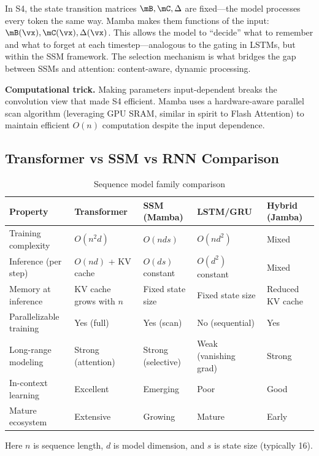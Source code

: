 \begin{keyinsight}
In S4, the state transition matrices $\mB, \mC, \Delta$ are fixed---the model processes every token the same way. Mamba makes them functions of the input: $\mB(\vx), \mC(\vx), \Delta(\vx)$. This allows the model to ``decide'' what to remember and what to forget at each timestep---analogous to the gating in LSTMs, but within the SSM framework. The selection mechanism is what bridges the gap between SSMs and attention: content-aware, dynamic processing.
\end{keyinsight}

\textbf{Computational trick.} Making parameters input-dependent breaks the convolution view that made S4 efficient. Mamba uses a hardware-aware parallel scan algorithm (leveraging GPU SRAM, similar in spirit to Flash Attention) to maintain efficient $O(n)$ computation despite the input dependence.

\subsection{Transformer vs SSM vs RNN Comparison}

\begin{table}[H]
\centering
\caption{Sequence model family comparison}
\begin{tabularx}{\textwidth}{lXXXX}
\toprule
\textbf{Property} & \textbf{Transformer} & \textbf{SSM (Mamba)} & \textbf{LSTM/GRU} & \textbf{Hybrid (Jamba)} \\
\midrule
Training complexity & $O(n^2 d)$ & $O(n d s)$ & $O(n d^2)$ & Mixed \\
Inference (per step) & $O(nd)$ + KV cache & $O(d s)$ constant & $O(d^2)$ constant & Mixed \\
Memory at inference & KV cache grows with $n$ & Fixed state size & Fixed state size & Reduced KV cache \\
Parallelizable training & Yes (full) & Yes (scan) & No (sequential) & Yes \\
Long-range modeling & Strong (attention) & Strong (selective) & Weak (vanishing grad) & Strong \\
In-context learning & Excellent & Emerging & Poor & Good \\
Mature ecosystem & Extensive & Growing & Mature & Early \\
\bottomrule
\end{tabularx}
\end{table}

Here $n$ is sequence length, $d$ is model dimension, and $s$ is state size (typically 16).

